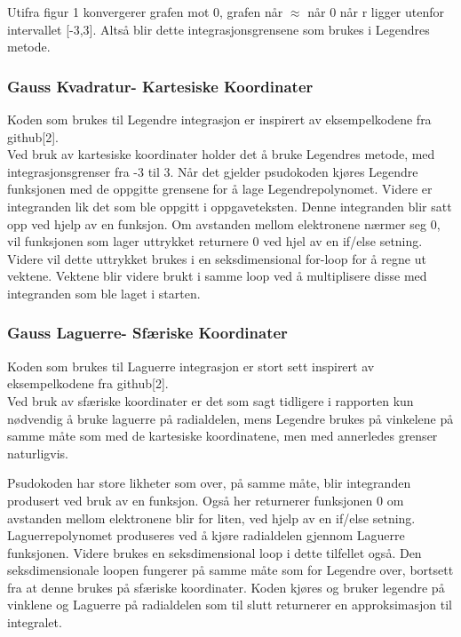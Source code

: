 \documentclass[%
oneside,                 %
final,                   %
10pt]{article}
\begin{document}
\noindent Utifra figur 1 konvergerer grafen mot 0, grafen når $\approx$ når 0 når r ligger utenfor intervallet [-3,3]. Altså blir dette integrasjonsgrensene som brukes i Legendres metode.


\subsubsection{Gauss Kvadratur- Kartesiske Koordinater}
\noindent Koden som brukes til Legendre integrasjon er inspirert av eksempelkodene fra github[2].\\
\noindent Ved bruk av kartesiske koordinater holder det å bruke Legendres metode, med integrasjonsgrenser fra -3 til 3. Når det gjelder psudokoden kjøres Legendre funksjonen med de oppgitte grensene for å lage Legendrepolynomet. Videre er integranden lik det som ble oppgitt i oppgaveteksten. Denne integranden blir satt opp ved hjelp av en funksjon. Om avstanden mellom elektronene nærmer seg 0, vil funksjonen som lager uttrykket returnere 0 ved hjel av en if/else setning.\\
\noindent Videre vil dette uttrykket brukes i en seksdimensional for-loop for å regne ut vektene. Vektene blir videre brukt i samme loop ved å multiplisere disse med integranden som ble laget i starten.
\subsubsection{Gauss Laguerre- Sfæriske Koordinater}
\noindent Koden som brukes til Laguerre integrasjon er stort sett inspirert av eksempelkodene fra github[2].\\
\noindent Ved bruk av sfæriske koordinater er det som sagt tidligere i rapporten kun nødvendig å bruke laguerre på radialdelen, mens Legendre brukes på vinkelene på samme måte som med de kartesiske koordinatene, men med annerledes grenser naturligvis.

\noindent Psudokoden har store likheter som over, på samme måte, blir integranden produsert ved bruk av en funksjon. Også her returnerer funksjonen 0 om avstanden mellom elektronene blir for liten, ved hjelp av en if/else setning. Laguerrepolynomet produseres ved å kjøre radialdelen gjennom Laguerre funksjonen. Videre brukes en seksdimensional loop i dette tilfellet også. Den seksdimensionale loopen fungerer på samme måte som for Legendre over, bortsett fra at denne brukes på sfæriske koordinater. Koden kjøres og bruker legendre på vinklene og Laguerre på radialdelen som til slutt returnerer en approksimasjon til integralet.
\end{document}

